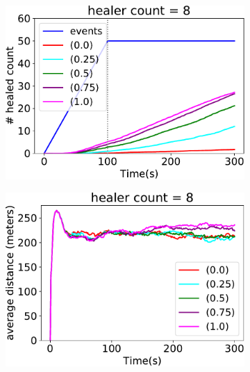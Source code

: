 \begin{figure}[t!]
\begin{subfigure}[b]{0.32\textwidth}
\end{subfigure}
\par\bigskip %
\centering
\begin{subfigure}[b]{0.32\textwidth}
\centering
\includegraphics[width=\textwidth]{papers/mdpi2020/imgs/healed-8.pdf}
\end{subfigure}
\hfill
%
\begin{subfigure}[b]{0.32\textwidth}
\centering
\includegraphics[width=\textwidth]{papers/mdpi2020/imgs/avg-distance-from-leader-8.pdf}
\end{subfigure}
\hfill
%
\begin{subfigure}[b]{0.32\textwidth}
\centering

\end{subfigure}
\end{figure}
